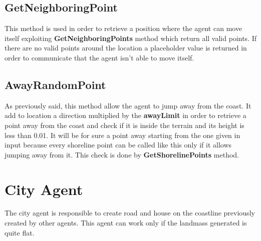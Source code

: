 \documentclass[12pt]{article}
\begin{document}
    \subsection{GetNeighboringPoint}
    This method is used in order to retrieve a position where the agent can move itself exploiting \textbf{GetNeighboringPoints} method which return all
    valid points. If there are no valid points around the location a placeholder value is returned in order to communicate that the agent isn't able
    to move itself.

    \subsection{AwayRandomPoint}
    As previously said, this method allow the agent to jump away from the coast. It add to location a direction multiplied by the \textbf{awayLimit} in order
    to retrieve a point away from the coast and check if it is inside the terrain and its height is less than 0.01. It will be for sure a point away starting
    from the one given in input because every shoreline point can be called like this only if it allows jumping away from it. This check is done by 
    \textbf{GetShorelinePoints} method.

    \section{City Agent}
    The city agent is responsible to create road and house on the coastline previously created by other agents. This agent can work only if the landmass generated
    is quite flat. 
\end{document}
